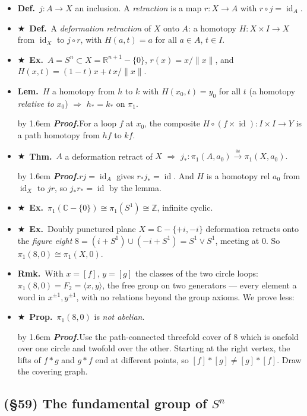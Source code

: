 \documentclass[12pt,a4paper]{article}
\newcommand{\Dfn}{\textbf{Def.}~}
\newcommand{\Thm}{\textbf{Thm.}~}
\newcommand{\Lem}{\textbf{Lem.}~}
\newcommand{\Prp}{\textbf{Prop.}~}
\newcommand{\Exa}{\textbf{Ex.}~}
\newcommand{\Rmk}{\textbf{Rmk.}~}
\newcommand{\Key}{$\bigstar$~}                  %
\newcommand{\Pf}[1]{%
  \par\addvspace{7pt}\nopagebreak
  \begingroup
    \advance\leftskip by 1.6em
    \parindent=0pt \small\color{prf}%
    \textbf{\textit{Proof.}}\enspace #1\par
  \endgroup
  \addvspace{9pt}}
\newenvironment{BL}%
  {\begin{itemize}[leftmargin=1.4em,labelsep=0.55em,itemsep=11pt,topsep=11pt,parsep=0pt]}%
  {\end{itemize}}
\newcommand{\RR}{\mathbb{R}}
\newcommand{\ZZ}{\mathbb{Z}}
\newcommand{\CX}{\mathbb{C}}
\DeclareMathOperator{\id}{id}
\newcommand{\imp}{\Rightarrow}
\begin{document}
\begin{BL}
\item \Dfn $j\colon A\to X$ an inclusion. A \emph{retraction} is a map $r\colon X\to A$ with
      $r\circ j=\id_A$.
\item \Key\Dfn A \emph{deformation retraction} of $X$ onto $A$: a homotopy
      $H\colon X\times I\to X$ from $\id_X$ to $j\circ r$, with $H(a,t)=a$ for all
      $a\in A$, $t\in I$.
\item \Key\Exa $A=S^n\subset X=\RR^{n+1}-\{0\}$, $r(x)=x/\|x\|$, and
      \(H(x,t)=(1-t)x+t\,x/\|x\|.\)
\item \Lem $H$ a homotopy from $h$ to $k$ with $H(x_0,t)=y_0$ for all $t$ (a homotopy
      \emph{relative to} $x_0$) $\imp$ $h_*=k_*$ on $\pi_1$.
\Pf{For a loop $f$ at $x_0$, the composite $H\circ(f\times\id)\colon I\times I\to Y$ is a
path homotopy from $hf$ to $kf$.}
\item \Key\Thm $A$ a deformation retract of $X$ $\imp$
      \(j_*\colon\pi_1(A,a_0)\xrightarrow{\ \cong\ }\pi_1(X,a_0).\)
\Pf{$rj=\id_A$ gives $r_*j_*=\id$. And $H$ is a homotopy rel $a_0$ from $\id_X$ to $jr$,
so $j_*r_*=\id$ by the lemma.}
\item \Key\Exa $\pi_1(\CX-\{0\})\cong\pi_1(S^1)\cong\ZZ$, infinite cyclic.
\item \Key\Exa Doubly punctured plane $X=\CX-\{+i,-i\}$ deformation retracts onto the
      \emph{figure eight} $8=(i+S^1)\cup(-i+S^1)=S^1\vee S^1$, meeting at $0$.
      So $\pi_1(8,0)\cong\pi_1(X,0)$.
\item \Rmk With $x=[f]$, $y=[g]$ the classes of the two circle loops:
      $\pi_1(8,0)=F_2=\langle x,y\rangle$, the free group on two generators ---
      every element a word in $x^{\pm1},y^{\pm1}$, with no relations beyond the group axioms.
      We prove less:
\item \Key\Prp $\pi_1(8,0)$ is \emph{not abelian}.
\Pf{Use the path-connected threefold cover of $8$ which is onefold over one circle and
twofold over the other. Starting at the right vertex, the lifts of $f*g$ and $g*f$ end at
different points, so $[f]*[g]\neq[g]*[f]$. Draw the covering graph.}
\end{BL}

\subsection{(\S59) The fundamental group of \texorpdfstring{$S^n$}{Sn}}
\end{document}
